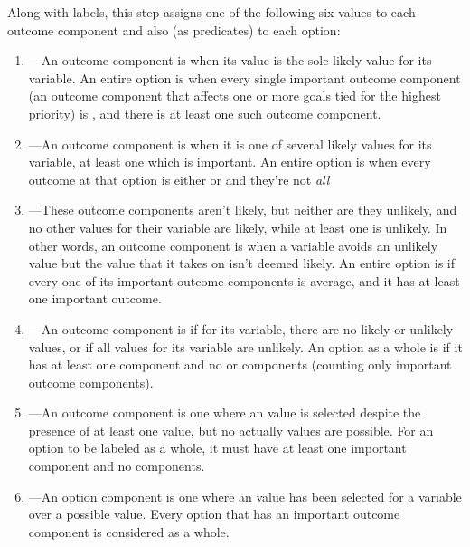 \begin{enumerate}[leftmargin=1.4em]
Along with  labels, this step assigns one of the following six  values to each outcome component and also (as  predicates) to each option:
%
\begin{enumerate}
\item
%
---An outcome component is  when its value is the sole likely value for its variable.
%
An entire option is  when every single important outcome component (an outcome component that affects one or more goals tied for the highest priority) is , and there is at least one such outcome component.
%
\item {}---An outcome component is  when it is one of several likely values for its variable, at least one which is important.
%
An entire option is  when every outcome at that option is either   or  and they're not \emph{all} 
%
\item {}---These outcome components aren't likely, but neither are they unlikely, and no other values for their variable are likely, while at least one is unlikely.
%
In other words, an outcome component is  when a variable avoids an unlikely value but the value that it takes on isn't deemed likely.
%
An entire option is  if every one of its important outcome components is average, and it has at least one important outcome.

\item {}---An outcome component is  if for its variable, there are no likely or unlikely values, or if all values for its variable are unlikely.
%
An option as a whole is  if it has at least one  component and no  or  components (counting only important outcome components).
\item {}---An  outcome component is one where an  value is selected despite the presence of at least one  value, but no actually  values are possible.
%
For an option to be labeled  as a whole, it must have at least one important  component and no  components.
\item {}---An  option component is one where an  value has been selected for a variable over a possible  value.
%
Every option that has an important  outcome component is considered  as a whole.
\end{enumerate}


\end{enumerate}
